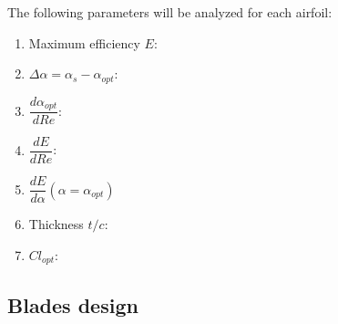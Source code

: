 \documentclass[../TFG_Report.tex]{subfiles}
\begin{document}
\FloatBarrier

The following parameters will be analyzed for each airfoil:


\begin{enumerate}
	\item Maximum efficiency $E$: 
	\item $\Delta \alpha=\alpha_{s}-\alpha_{opt}$: 
	\item $\dfrac{d\alpha_{opt}}{dRe}$:
	\item $\dfrac{dE}{dRe}$:
	\item $\dfrac{dE}{d \alpha} (\alpha=\alpha_{opt})$
	\item Thickness $t/c$:
	\item $Cl_{opt}$: 
	
\end{enumerate}







\subsection{Blades design}
	
	
\end{document}
